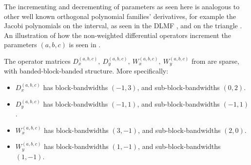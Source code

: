 The incrementing and decrementing of parameters as seen here is analogous to other well known orthogonal polynomial families' derivatives, for example the Jacobi polynomials on the interval, as seen in the DLMF \cite[(18.9.3)]{DLMF}, and on the triangle \cite{olver2018recurrence}. An illustration of how the non-weighted differential operators increment the parameters $(a,b,c)$ is seen in .

\begin{theorem}\label{theorem:ds:sparsityofdifferentialoperators}
	The operator matrices $D_x^{(a,b,c)}, \: D_y^{(a,b,c)}, \: W_x^{(a,b,c)}, \: W_y^{(a,b,c)}$ from  are sparse, with banded-block-banded structure. More specifically:
\begin{itemize}
	\item $D_x^{(a,b,c)}$ has  block-bandwidths $(-1,3)$, and sub-block-bandwidths $(0, 2)$.
  	\item $D_y^{(a,b,c)}$ has  block-bandwidths $(-1,1)$, and sub-block-bandwidths $(-1,1)$.
	\item $W_x^{(a,b,c)}$ has  block-bandwidths $(3,-1)$, and sub-block-bandwidths $(2, 0)$.
  	\item $W_y^{(a,b,c)}$ has  block-bandwidths $(1,-1)$, and sub-block-bandwidths $(1,-1)$.
\end{itemize}
\end{theorem}

